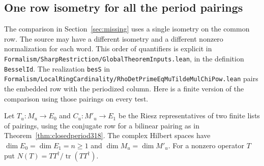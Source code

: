 \documentclass[a4paper,11pt]{article}
\theoremstyle{definition}
\theoremstyle{remark}
\numberwithin{equation}{section}
\begin{document}
\subsection{One row isometry for all the period pairings}\label{nav:I-79}
The comparison in Section~\ref{sec:missing} uses a single
isometry on the common row. The source may have a different
isometry and a different nonzero normalization for each word.
This order of quantifiers is explicit in
\nolinkurl{Formalism/SharpRestriction/GlobalTheoremInputs.lean},
in the definition \texttt{BesselId}. The realization
\texttt{besS} in
\nolinkurl{Formalism/LocalRingCardinality/RhoDetPrimeEqMuTildeMulChiPow.lean}
pairs the embedded row with the periodized column. Here
is a finite version of the comparison using those pairings
on every test.

Let \(T_u:M_u\to E_0\) and \(C_u:M'_u\to E_1\) be the
Riesz representatives of two finite lists of pairings, using
the conjugate row for a bilinear pairing as in
Theorem~\ref{thm:closedperiod318}. The complex Hilbert spaces
have \(\dim E_0=\dim E_1=n\ge1\) and
\(\dim M_u=\dim M'_u\). For a nonzero operator \(T\) put
\(N(T)=TT^\dagger/\operatorname{tr}(TT^\dagger)\).
\end{document}
